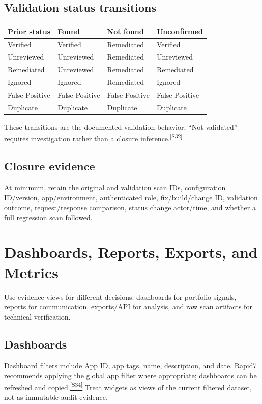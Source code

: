\documentclass[11pt,letterpaper,oneside]{scrreprt}
\newcommand{\src}[1]{\hyperref[src:#1]{\textsuperscript{\color{R7Orange}[#1]}}}
\newcommand{\chapterlead}[1]{\begin{tcolorbox}[enhanced,colback=R7Light,colframe=R7Light,boxrule=0pt,borderline west={3pt}{0pt}{R7Orange},arc=0pt,left=9pt,right=9pt,top=7pt,bottom=7pt]#1\end{tcolorbox}}
\begin{document}
\section{Validation status transitions}
\begin{tabularx}{\textwidth}{@{}P{1.3in}P{1.55in}P{1.55in}P{1.55in}@{}}
\toprule
\textbf{Prior status} & \textbf{Found} & \textbf{Not found} & \textbf{Unconfirmed}\\
\midrule
Verified & Verified & Remediated & Verified\\
Unreviewed & Unreviewed & Remediated & Unreviewed\\
Remediated & Unreviewed & Remediated & Remediated\\
Ignored & Ignored & Remediated & Ignored\\
False Positive & False Positive & False Positive & False Positive\\
Duplicate & Duplicate & Duplicate & Duplicate\\
\bottomrule
\end{tabularx}
These transitions are the documented validation behavior; ``Not validated'' requires investigation rather than a closure inference.\src{S32}

\section{Closure evidence}
At minimum, retain the original and validation scan IDs, configuration ID/version, app/environment, authenticated role, fix/build/change ID, validation outcome, request/response comparison, status change actor/time, and whether a full regression scan followed.

\chapter{Dashboards, Reports, Exports, and Metrics}
\chapterlead{Use evidence views for different decisions: dashboards for portfolio signals, reports for communication, exports/API for analysis, and raw scan artifacts for technical verification.}

\section{Dashboards}
Dashboard filters include App ID, app tags, name, description, and date. Rapid7 recommends applying the global app filter where appropriate; dashboards can be refreshed and copied.\src{S34} Treat widgets as views of the current filtered dataset, not as immutable audit evidence.
\end{document}
